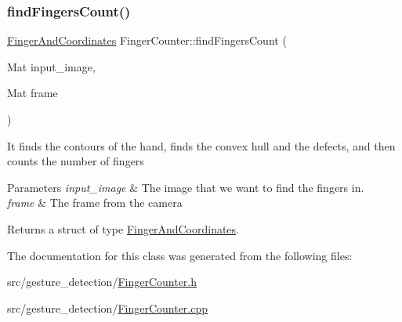 \subsubsection{\texorpdfstring{find\+Fingers\+Count()}{findFingersCount()}}
{\footnotesize\ttfamily \hyperlink{classGestureDetection_1_1FingerAndCoordinates}{Finger\+And\+Coordinates} Finger\+Counter\+::find\+Fingers\+Count (\begin{DoxyParamCaption}\item[{Mat}]{input\+\_\+image,  }\item[{Mat}]{frame }\end{DoxyParamCaption})}

It finds the contours of the hand, finds the convex hull and the defects, and then counts the number of fingers


\begin{DoxyParams}{Parameters}
{\em input\+\_\+image} & The image that we want to find the fingers in. \\
\hline
{\em frame} & The frame from the camera\\
\hline
\end{DoxyParams}
\begin{DoxyReturn}{Returns}
a struct of type \hyperlink{classGestureDetection_1_1FingerAndCoordinates}{Finger\+And\+Coordinates}. 
\end{DoxyReturn}


The documentation for this class was generated from the following files\+:\begin{DoxyCompactItemize}
\item 
src/gesture\+\_\+detection/\hyperlink{FingerCounter_8h}{Finger\+Counter.\+h}\item 
src/gesture\+\_\+detection/\hyperlink{FingerCounter_8cpp}{Finger\+Counter.\+cpp}\end{DoxyCompactItemize}
